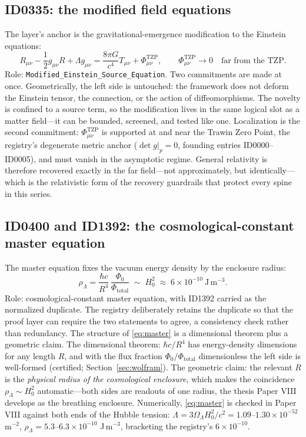 \documentclass[11pt]{article}
\theoremstyle{remark}
\begin{document}
\subsection{ID0335: the modified field equations}

The layer's anchor is the gravitational-emergence modification to the Einstein equations:
\begin{equation}
R_{\mu\nu} - \frac{1}{2} g_{\mu\nu} R + \Lambda g_{\mu\nu} = \frac{8\pi G}{c^4} T_{\mu\nu} + \Phi^{\mathrm{TZP}}_{\mu\nu},
\qquad \Phi^{\mathrm{TZP}}_{\mu\nu} \to 0 \quad \text{far from the TZP}.
\label{eq:modeinstein}
\end{equation}
Role: \texttt{Modified\_Einstein\_Source\_Equation}. Two commitments are made at once. Geometrically, the left side is untouched: the framework does not deform the Einstein tensor, the connection, or the action of diffeomorphisms. The novelty is confined to a source term, so the modification lives in the same logical slot as a matter field---it can be bounded, screened, and tested like one. Localization is the second commitment: $\Phi^{\mathrm{TZP}}_{\mu\nu}$ is supported at and near the Trawin Zero Point, the registry's degenerate metric anchor ($\det g|_p = 0$, founding entries ID0000--ID0005), and must vanish in the asymptotic regime. General relativity is therefore recovered exactly in the far field---not approximately, but identically---which is the relativistic form of the recovery guardrails that protect every spine in this series.

\subsection{ID0400 and ID1392: the cosmological-constant master equation}

The master equation fixes the vacuum energy density by the enclosure radius:
\begin{equation}
\rho_\Lambda = \frac{\hbar c}{R^4}\, \frac{\Phi_0}{\Phi_{\mathrm{total}}} \;\sim\; H_0^2 \;\approx\; 6 \times 10^{-10}\ \mathrm{J\,m^{-3}}.
\label{eq:master}
\end{equation}
Role: cosmological-constant master equation, with ID1392 carried as the normalized duplicate. The registry deliberately retains the duplicate so that the proof layer can require the two statements to agree, a consistency check rather than redundancy. The structure of \eqref{eq:master} is a dimensional theorem plus a geometric claim. The dimensional theorem: $\hbar c / R^4$ has energy-density dimensions for any length $R$, and with the flux fraction $\Phi_0/\Phi_{\mathrm{total}}$ dimensionless the left side is well-formed (certified; Section~\ref{sec:wolfram}). The geometric claim: the relevant $R$ is the \emph{physical radius of the cosmological enclosure}, which makes the coincidence $\rho_\Lambda \sim H_0^2$ automatic---both sides are readouts of one radius, the thesis Paper VIII develops as the breathing enclosure. Numerically, \eqref{eq:master} is checked in Paper VIII against both ends of the Hubble tension: $\Lambda = 3\Omega_\Lambda H_0^2/c^2 = 1.09$--$1.30 \times 10^{-52}$ m$^{-2}$, $\rho_\Lambda = 5.3$--$6.3 \times 10^{-10}$ J\,m$^{-3}$, bracketing the registry's $6 \times 10^{-10}$.
\end{document}
